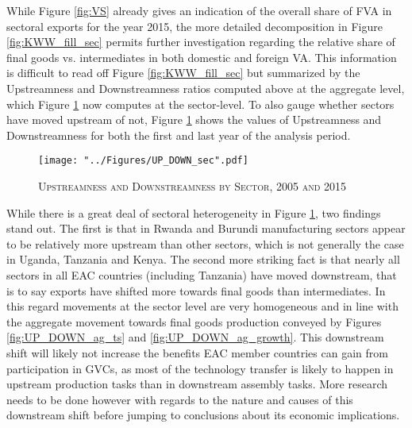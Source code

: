 \documentclass[a4paper]{article}
\begin{document}
While Figure \ref{fig:VS} already gives an indication of the overall share of FVA in sectoral exports for the year 2015, the more detailed decomposition in Figure \ref{fig:KWW_fill_sec} permits further investigation regarding the relative share of final goods vs. intermediates in both domestic and foreign VA.  This information is difficult to read off Figure \ref{fig:KWW_fill_sec} but summarized by the Upstreamness and Downstreamness ratios computed above at the aggregate level, which Figure \ref{fig:UP_DOWN_sec} now computes at the sector-level. To also gauge whether sectors have moved upstream of not, Figure \ref{fig:UP_DOWN_sec} shows the values of Upstreamness and Downstreamness for both the first and last year of the analysis period. 

\begin{figure}[h!]
\centering
\caption{\label{fig:UP_DOWN_sec}\textsc{Upstreamness and Downstreamness by Sector, 2005 and 2015}}
\texttt{[image: "../Figures/UP\_DOWN\_sec".pdf]} %
\end{figure}
\FloatBarrier

While there is a great deal of sectoral heterogeneity in Figure \ref{fig:UP_DOWN_sec}, two findings stand out. The first is that in Rwanda and Burundi manufacturing sectors appear to be relatively more upstream than other sectors, which is not generally the case in Uganda, Tanzania and Kenya. The second more striking fact is that nearly all sectors in all EAC countries (including Tanzania) have moved downstream, that is to say exports have shifted more towards final goods than intermediates. In this regard movements at the sector level are very homogeneous and in line with the aggregate movement towards final goods production conveyed by Figures \ref{fig:UP_DOWN_ag_ts} and \ref{fig:UP_DOWN_ag_growth}. This downstream shift will likely not increase the benefits EAC member countries can gain from participation in GVCs, as most of the technology transfer is likely to happen in upstream production tasks than in downstream assembly tasks. More research needs to be done however with regards to the nature and causes of this downstream shift before jumping to conclusions about its economic implications. 
\end{document}
